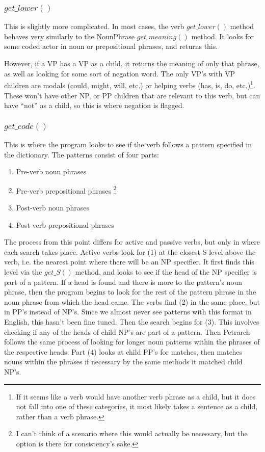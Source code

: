 \documentclass[11pt]{article}
\begin{document}
\subsubsection{$get\_lower()$}
This is slightly more complicated. In most cases, the verb $get\_lower()$ method 
behaves very similarly to the NounPhrase $get\_meaning()$ method. It looks for 
some coded actor in noun or prepositional phrases, and returns this. 

However, if 
a VP has a VP as a child, it returns the meaning of only that phrase, as well as looking 
for some sort of negation word. The only 
VP's with VP children are modals (could, might, will, etc.) or helping verbs (has, is, 
do, etc.)\footnote{If it seems like a verb would have another verb phrase as a child, but it does not fall into one of these categories,
it most likely takes a sentence as a child, rather than a verb phrase. }. These won't have other NP, or PP children that are relevant to 
this verb, but can have ``not'' as a child, so this is where negation is 
flagged.
\subsubsection{$get\_code()$}
This is where the program looks to see if the verb follows a pattern 
specified in the dictionary. The patterns consist of four parts: \begin{enumerate}
\item Pre-verb noun phrases \item Pre-verb prepositional phrases \footnote{I can't think of a scenario where 
this would actually be necessary, but the option is there for consistency's sake.} \item 
Post-verb noun phrases \item Post-verb prepositional phrases \end{enumerate}

The process from this point differs for active and passive verbs, but only in 
where each search takes place. Active verbs look for (1) at the closest S-level above the verb, i.e. the 
nearest point where there will be an NP specifier. It first finds this level via 
the $get\_S()$ method, and looks to see if the head of the NP specifier is part 
of a pattern. If a head is found and there is more to the pattern's noun phrase,
 then the program begins to look for the
rest of the pattern phrase in the noun phrase from which the head came. 
 The verbs find (2) in the same place, but in PP's instead of NP's. Since we 
almost never see patterns with this format in English, this hasn't been fine 
tuned. Then the search begins for (3). This involves checking if any of the 
heads of child NP's are part of a pattern. Then Petrarch follows the same process of looking for 
longer noun patterns within the phrases of the respective heads.
Part (4) looks at child PP's for matches, then matches nouns within the phrases 
if necessary by the same methods it matched child NP's.
\end{document}
